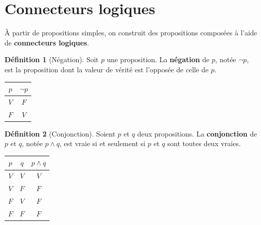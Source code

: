 \documentclass[12pt,a4paper,openany]{book}
\theoremstyle{definition}
\newtheorem{definition}{Définition}[chapter]
\theoremstyle{plain}
\theoremstyle{remark}
\begin{document}
\section{Connecteurs logiques}
\label{sec:connecteurs}

\`A partir de propositions simples, on construit des propositions compos\'ees \`a l'aide de \textbf{connecteurs logiques}.

\begin{definition}[N\'egation]\label{def:negation}
  Soit $p$ une proposition. La \textbf{n\'egation} de $p$, not\'ee $\neg p$\index{$\neg$}, est la proposition dont la valeur de v\'erit\'e est l'oppos\'ee de celle de $p$.

  \medskip
  \begin{center}
  \begin{tabular}{c|c}
    \toprule
    $p$ & $\neg p$ \\ \midrule
    $V$ & $F$ \\
    $F$ & $V$ \\
    \bottomrule
  \end{tabular}
  \end{center}
\end{definition}

\begin{definition}[Conjonction]\label{def:conjonction}
  Soient $p$ et $q$ deux propositions. La \textbf{conjonction} de $p$ et $q$, not\'ee $p \land q$\index{$\land$}, est vraie si et seulement si $p$ et $q$ sont toutes deux vraies.

  \medskip
  \begin{center}
  \begin{tabular}{cc|c}
    \toprule
    $p$ & $q$ & $p \land q$ \\ \midrule
    $V$ & $V$ & $V$ \\
    $V$ & $F$ & $F$ \\
    $F$ & $V$ & $F$ \\
    $F$ & $F$ & $F$ \\
    \bottomrule
  \end{tabular}
  \end{center}
\end{definition}
\end{document}
